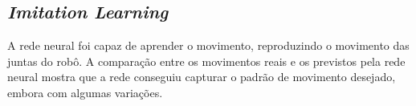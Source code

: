 \documentclass[a4paper,12pt]{article}
\begin{document}
\subsection{\textit{Imitation Learning}}

A rede neural foi capaz de aprender o movimento, reproduzindo o movimento das juntas do robô. A comparação entre os movimentos reais e os previstos pela rede neural mostra que a rede conseguiu capturar o padrão de movimento desejado, embora com algumas variações.
\end{document}
